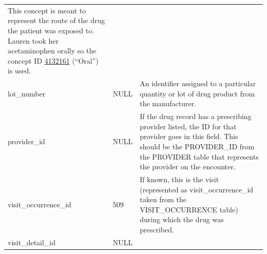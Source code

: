 \documentclass[11pt]{book}
\theoremstyle{definition}
\theoremstyle{definition}
\theoremstyle{definition}
\theoremstyle{remark}
\begin{document}
\begin{longtable}[]{@{}lll@{}}
\begin{minipage}[t]{0.49\columnwidth}
This concept is meant to represent the route of the drug the patient was exposed to. Lauren took her acetaminophen orally so the concept ID \href{http://athena.ohdsi.org/search-terms/terms/4132161}{4132161} (``Oral'') is used.\strut
\end{minipage}\tabularnewline
\begin{minipage}[t]{0.28\columnwidth}\raggedright
lot\_number\strut
\end{minipage} & \begin{minipage}[t]{0.15\columnwidth}\raggedright
NULL\strut
\end{minipage} & \begin{minipage}[t]{0.49\columnwidth}\raggedright
An identifier assigned to a particular quantity or lot of drug product from the manufacturer.\strut
\end{minipage}\tabularnewline
\begin{minipage}[t]{0.28\columnwidth}\raggedright
provider\_id\strut
\end{minipage} & \begin{minipage}[t]{0.15\columnwidth}\raggedright
NULL\strut
\end{minipage} & \begin{minipage}[t]{0.49\columnwidth}\raggedright
If the drug record has a prescribing provider listed, the ID for that provider goes in this field. This should be the PROVIDER\_ID from the PROVIDER table that represents the provider on the encounter.\strut
\end{minipage}\tabularnewline
\begin{minipage}[t]{0.28\columnwidth}\raggedright
visit\_occurrence\_id\strut
\end{minipage} & \begin{minipage}[t]{0.15\columnwidth}\raggedright
509\strut
\end{minipage} & \begin{minipage}[t]{0.49\columnwidth}\raggedright
If known, this is the visit (represented as visit\_occurrence\_id taken from the VISIT\_OCCURRENCE table) during which the drug was prescribed.\strut
\end{minipage}\tabularnewline
\begin{minipage}[t]{0.28\columnwidth}\raggedright
visit\_detail\_id\strut
\end{minipage} & \begin{minipage}[t]{0.15\columnwidth}\raggedright
NULL\strut
\end{minipage} & \begin{minipage}[t]{0.49\columnwidth}\raggedright

\end{minipage}
\end{longtable}
\end{document}
